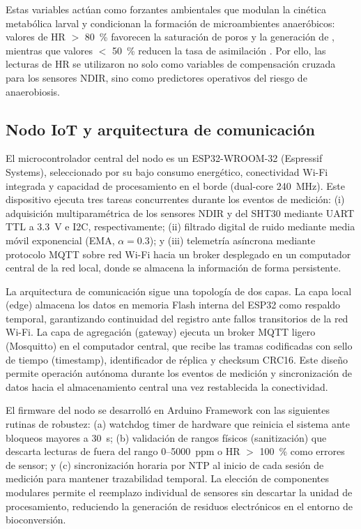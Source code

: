Estas variables actúan como forzantes ambientales que modulan la cinética metabólica larval \parencite{eriksenDynamicModellingFeed2022} y condicionan la formación de microambientes anaeróbicos: valores de HR $>$ \SI{80}{\percent} favorecen la saturación de poros y la generación de , mientras que valores $<$ \SI{50}{\percent} reducen la tasa de asimilación \parencite{bekkerImpactSubstrateMoisture2021a, salamEffectDifferentEnvironmental2022}. Por ello, las lecturas de HR se utilizaron no solo como variables de compensación cruzada para los sensores NDIR, sino como predictores operativos del riesgo de anaerobiosis.

\subsection{Nodo IoT y arquitectura de comunicación}
\label{subsec:cap2_nodo_iot}

El microcontrolador central del nodo es un ESP32-WROOM-32 (Espressif Systems), seleccionado por su bajo consumo energético, conectividad Wi-Fi integrada y capacidad de procesamiento en el borde (dual-core \SI{240}{\mega\hertz}). Este dispositivo ejecuta tres tareas concurrentes durante los eventos de medición: (i) adquisición multiparamétrica de los sensores NDIR y del SHT30 mediante UART TTL a \SI{3.3}{\volt} e I2C, respectivamente; (ii) filtrado digital de ruido mediante media móvil exponencial (EMA, $\alpha = 0.3$); y (iii) telemetría asíncrona mediante protocolo MQTT sobre red Wi-Fi hacia un broker desplegado en un computador central de la red local, donde se almacena la información de forma persistente.

La arquitectura de comunicación sigue una topología de dos capas. La capa local (edge) almacena los datos en memoria Flash interna del ESP32 como respaldo temporal, garantizando continuidad del registro ante fallos transitorios de la red Wi-Fi. La capa de agregación (gateway) ejecuta un broker MQTT ligero (Mosquitto) en el computador central, que recibe las tramas codificadas con sello de tiempo (timestamp), identificador de réplica y checksum CRC16. Este diseño permite operación autónoma durante los eventos de medición y sincronización de datos hacia el almacenamiento central una vez restablecida la conectividad.

El firmware del nodo se desarrolló en Arduino Framework con las siguientes rutinas de robustez: (a) watchdog timer de hardware que reinicia el sistema ante bloqueos mayores a \SI{30}{\second}; (b) validación de rangos físicos (sanitización) que descarta lecturas de  fuera del rango \num{0}--\num{5000}~ppm o HR $>$ \SI{100}{\percent} como errores de sensor; y (c) sincronización horaria por NTP al inicio de cada sesión de medición para mantener trazabilidad temporal. La elección de componentes modulares permite el reemplazo individual de sensores sin descartar la unidad de procesamiento, reduciendo la generación de residuos electrónicos en el entorno de bioconversión.